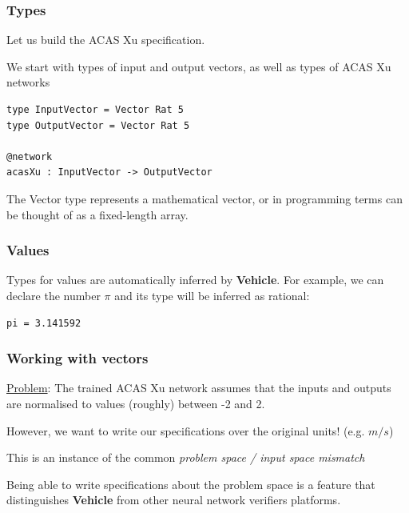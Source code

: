 \documentclass[t,compress,aspectratio=169]{beamer}
\begin{document}

\begin{frame}[fragile]
\frametitle{Types}
Let us build the ACAS Xu specification.

We start with types of input and output vectors, as well as types of ACAS Xu networks

\vspace{1em}

\begin{verbatim}
type InputVector = Vector Rat 5
type OutputVector = Vector Rat 5

@network
acasXu : InputVector -> OutputVector
\end{verbatim}

\vspace{1em}

The Vector type represents a mathematical vector, or in programming terms can be thought of as a fixed-length array.
\end{frame}


\begin{frame}[fragile]
\frametitle{Values}

Types for values are automatically inferred by \textbf{Vehicle}. For example, we can declare the number $\pi$ and its type will be inferred as rational:

\begin{verbatim}
pi = 3.141592
\end{verbatim}
\end{frame}


\begin{frame}[fragile]
\frametitle{Working with vectors}

\underline{Problem}: The trained ACAS Xu network assumes that the inputs and outputs are normalised to values (roughly) between -2 and 2.

\pause
\vspace{1em}

However, we want to write our specifications over the original units! (e.g. $m/s$)

\pause
\vspace{1em}

This is an instance of the common \emph{problem space / input space mismatch}

\pause
\vspace{1em}

Being able to write specifications about the problem space is a feature that distinguishes \textbf{Vehicle} from
other neural network verifiers platforms.
\end{frame}
\end{document}
